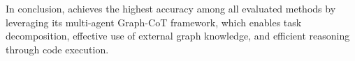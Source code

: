 In conclusion, \projectname achieves the highest accuracy among all evaluated methods by leveraging its multi-agent Graph-CoT framework, which enables task decomposition, effective use of external graph knowledge, and efficient reasoning through code execution.




















